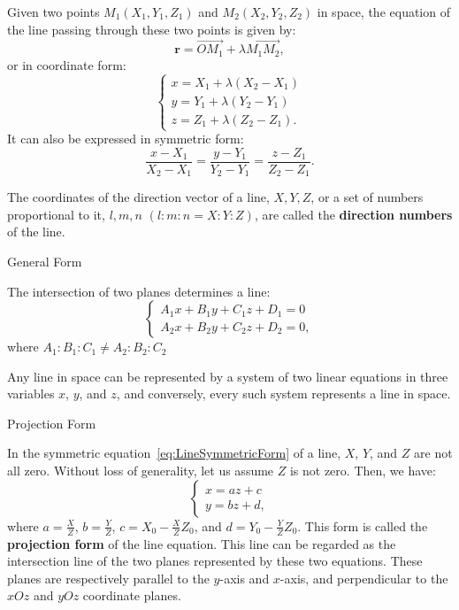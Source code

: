 \documentclass[11pt]{../../TexTemplate/elegantbook} %
\begin{document}
\vspace{0.7cm}
Given two points \(M_{1}(X_{1}, Y_{1}, Z_{1})\) and \(M_{2}(X_{2}, Y_{2}, Z_{2})\) in space,
the equation of the line passing through these two points is given by:
\[
\mathbf{r} = \vec{OM_{1}} + \lambda \vec{M_{1}M_{2}},
\]
or in coordinate form:
\[
\begin{cases}
x = X_{1} + \lambda (X_{2} - X_{1}) \\
y = Y_{1} + \lambda (Y_{2} - Y_{1}) \\
z = Z_{1} + \lambda (Z_{2} - Z_{1}).
\end{cases}
\]
It can also be expressed in symmetric form:
\[
\frac{x - X_{1}}{X_{2} - X_{1}} = \frac{y - Y_{1}}{Y_{2} - Y_{1}} = \frac{z - Z_{1}}{Z_{2} - Z_{1}}.
\]

The coordinates of the direction vector of a line, \(X, Y, Z\), or a set of numbers proportional to it, 
\(l, m, n\) \((l : m : n = X : Y : Z)\), are called the \textbf{direction numbers} of the line.

\begin{leftbarTitle}{General Form}\end{leftbarTitle}
The intersection of two planes determines a line:
\[
\begin{cases}
A_{1}x + B_{1}y + C_{1}z + D_{1} = 0 \\
A_{2}x + B_{2}y + C_{2}z + D_{2} = 0,
\end{cases}
\]
where \(A_{1} : B_{1} : C_{1} \neq A_{2} : B_{2} : C_{2}\)

\begin{theorem}
    Any line in space can be represented by a system of two linear equations in three variables \(x\), \(y\), and \(z\),
    and conversely, every such system represents a line in space.
    
\end{theorem}

\begin{leftbarTitle}{Projection Form}\end{leftbarTitle}
In the symmetric equation~\ref{eq:LineSymmetricForm} of a line,
\(X\), \(Y\), and \(Z\) are not all zero. 
Without loss of generality, let us assume \(Z\) is not zero. 
Then, we have:
\[
\begin{cases}
    x = az + c \\
    y = bz + d,
\end{cases}
\]
where \(a = \frac{X}{Z}\), \(b = \frac{Y}{Z}\), \(c = X_{0} - \frac{X}{Z}Z_{0}\), and \(d = Y_{0} - \frac{Y}{Z}Z_{0}\).
This form is called the \textbf{projection form} of the line equation.
This line can be regarded as the intersection line of the two planes represented by these two equations. 
These planes are respectively parallel to the \(y\)-axis and \(x\)-axis, 
and perpendicular to the \(xOz\) and \(yOz\) coordinate planes.
\end{document}
